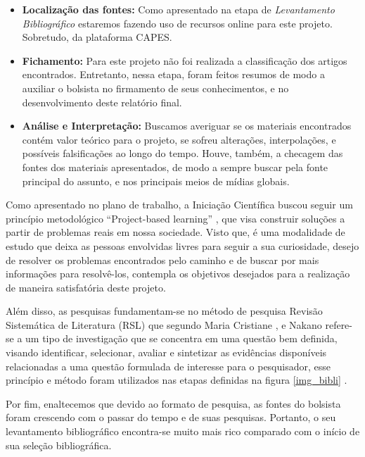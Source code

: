 \begin{itemize}
\item \textbf{Localização das fontes:} Como apresentado na etapa de  \textit{Levantamento Bibliográfico} estaremos fazendo uso de recursos online para este projeto. Sobretudo, da plataforma CAPES.

\item \textbf{Fichamento:} Para este projeto não foi realizada a classificação dos artigos encontrados. Entretanto, nessa etapa, foram feitos resumos de modo a auxiliar o bolsista no firmamento de seus conhecimentos, e no desenvolvimento deste relatório final.

\item \textbf{Análise e Interpretação:} Buscamos averiguar se os materiais encontrados contém valor teórico para o projeto, se sofreu alterações, interpolações, e possíveis falsificações ao longo do tempo. Houve, também, a checagem das fontes dos materiais apresentados, de modo a sempre buscar pela fonte principal do assunto, e nos principais meios de mídias globais.


\end{itemize}

 
Como apresentado no plano de trabalho, a Iniciação Científica buscou seguir um princípio metodológico “Project-based learning” \cite{krajcik2006project}, que visa construir soluções a partir de problemas reais em nossa sociedade. Visto que, é uma modalidade de estudo que deixa as pessoas envolvidas livres para seguir a sua curiosidade, desejo de resolver os problemas encontrados pelo caminho e de buscar por mais informações para resolvê-los, contempla os objetivos desejados para a realização de maneira satisfatória deste projeto. 

Além disso, as pesquisas fundamentam-se no método de pesquisa Revisão Sistemática de Literatura (RSL) que segundo Maria Cristiane \cite{revi3}, e Nakano \cite{revi2} refere-se a um tipo de investigação que se concentra em uma questão bem definida, visando identificar, selecionar, avaliar e sintetizar as evidências disponíveis relacionadas a uma questão formulada de interesse para o pesquisador, esse princípio e método foram utilizados nas etapas definidas na figura \ref{img_bibli} .

Por fim, enaltecemos que devido ao formato de pesquisa, as fontes do bolsista foram crescendo com o passar do tempo e de suas pesquisas. Portanto, o seu levantamento bibliográfico encontra-se muito mais rico comparado com o início de sua seleção bibliográfica.


\vspace {1cm}

